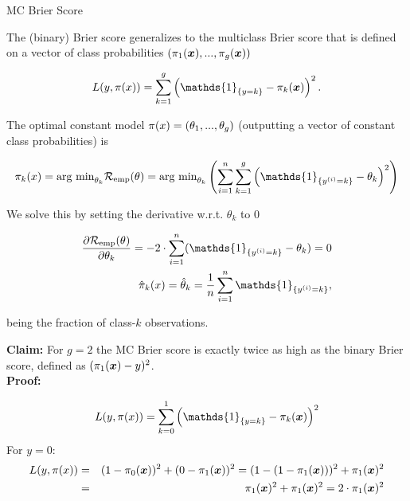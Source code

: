 \begin{vbframe}{MC Brier Score}

The (binary) Brier score generalizes to the multiclass Brier score that is defined on a vector of class probabilities $\left(\pi_1(\bm{x}), ..., \pi_g(\bm{x})\right)$

\begin{footnotesize}
$$
  L(y, \pi(x)) = \sum_{k = 1}^g \left(\mathds{1}_{\{y = k\}} - \pi_k(\xv)\right)^2.
$$
\end{footnotesize}

The optimal constant model $\pi(x) = \left(\theta_1, ..., \theta_g\right)$ (outputting a vector of constant class probabilities) is  

\vspace*{-0.5cm}
\begin{footnotesize}
  \begin{eqnarray*}
    \pikx =\text{arg min}_{\theta_k} \riske(\theta) = \text{arg min}_{\theta_k} \left(\sumin \sum_{k = 1}^g \left(\mathds{1}_{\{\yi = k\}} - \theta_k\right)^2\right) 
      \end{eqnarray*}
      \end{footnotesize}
        We solve this by setting the derivative w.r.t. $\theta_k$ to 0
        \begin{footnotesize}
      \begin{eqnarray*}
      \frac{\partial \riske(\theta)}{\partial \theta_k} = - 2 \cdot \sumin (\mathds{1}_{\{\yi = k\}} - \theta_k) = 0 \\
    \pikxh = \thetah_k = \frac{1}{n} \sumin \mathds{1}_{\{\yi = k\}},   
    \end{eqnarray*}
\end{footnotesize}
being the fraction of class-$k$ observations. 

\framebreak

\textbf{Claim:} For $g = 2$ the MC Brier score is exactly twice as high as the binary Brier score, defined as $(\pi_1(\bm{x}) - y)^2$. \\
\lz
\textbf{Proof:}
\begin{footnotesize}
$$
  L(y, \pi(x)) = \sum_{k = 0}^1 \left(\mathds{1}_{\{y = k\}} - \pi_k(\xv)\right)^2
  $$
  For $y = 0$:
  \begin{eqnarray*}
  L(y, \pi(x)) &=& (1-\pi_0(\bm{x}))^2 + (0 - \pi_1(\bm{x}))^2  = (1-(1 - \pi_1(\bm{x})))^2 + \pi_1(\bm{x})^2 \\
  &=& \pi_1(\bm{x})^2 + \pi_1(\bm{x})^2 = 2 \cdot \pi_1(\bm{x})^2
  \end{eqnarray*}


\end{footnotesize}
\end{vbframe}
